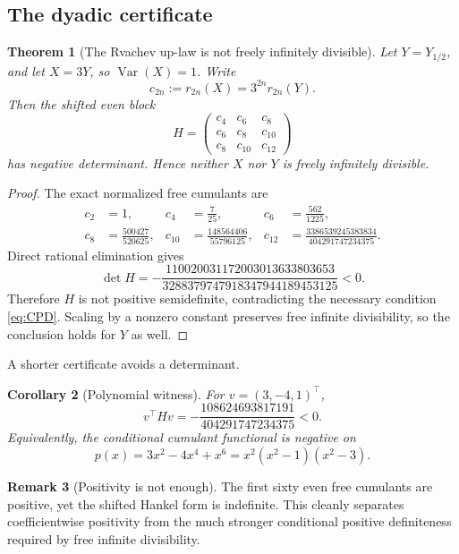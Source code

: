 \documentclass[11pt]{article}
\newtheorem{theorem}{Theorem}[section]
\newtheorem{corollary}[theorem]{Corollary}
\theoremstyle{definition}
\newtheorem{remark}[theorem]{Remark}
\newcommand{\Var}{\operatorname{Var}}
\begin{document}
\subsection{The dyadic certificate}
\begin{theorem}[The Rvachev up-law is not freely infinitely divisible]\label{thm:upnotFID}
Let \(Y=Y_{1/2}\), and let \(X=3Y\), so \(\Var(X)=1\). Write
\[
c_{2n}:=r_{2n}(X)=3^{2n}r_{2n}(Y).
\]
Then the shifted even block
\begin{equation}\label{eq:Hmatrix}
H=\begin{pmatrix}
c_4&c_6&c_8\\
c_6&c_8&c_{10}\\
c_8&c_{10}&c_{12}
\end{pmatrix}
\end{equation}
has negative determinant. Hence neither \(X\) nor \(Y\) is freely infinitely divisible.
\end{theorem}

\begin{proof}
The exact normalized free cumulants are
\begin{align*}
c_2&=1,& c_4&=\frac7{25},& c_6&=\frac{562}{1225},\\
c_8&=\frac{500427}{520625},&
c_{10}&=\frac{148564406}{55796125},&
c_{12}&=\frac{3386539245383834}{404291747234375}.
\end{align*}
Direct rational elimination gives
\begin{equation}\label{eq:negativeDet}
\det H=-\frac{110020031172003013633803653}
{3288379747918347944189453125}<0.
\end{equation}
Therefore \(H\) is not positive semidefinite, contradicting the necessary condition \eqref{eq:CPD}. Scaling by a nonzero constant preserves free infinite divisibility, so the conclusion holds for \(Y\) as well.
\end{proof}

A shorter certificate avoids a determinant.
\begin{corollary}[Polynomial witness]\label{cor:polywitness}
For \(v=(3,-4,1)^\top\),
\begin{equation}\label{eq:negativeQ}
v^\top Hv=-\frac{108624693817191}{404291747234375}<0.
\end{equation}
Equivalently, the conditional cumulant functional is negative on
\[
p(x)=3x^2-4x^4+x^6=x^2(x^2-1)(x^2-3).
\]
\end{corollary}

\begin{remark}[Positivity is not enough]
The first sixty even free cumulants are positive, yet the shifted Hankel form is indefinite. This cleanly separates coefficientwise positivity from the much stronger conditional positive definiteness required by free infinite divisibility.
\end{remark}
\end{document}
